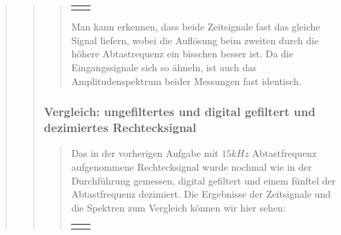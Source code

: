\begin{quote}
\begin{quote}
\begin{quote}
\begin{center}
\begin{tabular}{ll}
\begin{minipage}{0.6\textwidth}
                    \end{minipage}
    
                \end{tabular}
                \end{center}
    			    	
        	\vspace{1.5em}
    	
    	Man kann erkennen, dass beide Zeitsignale fast das gleiche Signal liefern,
    	wobei die Auflösung beim zweiten durch die höhere Abtastrequenz ein
    	bisschen besser ist. Da die Eingangssignale sich so ähneln, ist auch das
    	Amplitudenspektrum beider Messungen fast identisch.
    			
    	\end{quote}
    
        \subsubsection{Vergleich: ungefiltertes und digital gefiltert und
        dezimiertes Rechtecksignal}
        \begin{quote}
        
        Das in der vorherigen Aufgabe mit $15 kHz$ Abtastfrequenz
        aufgenommene Rechtecksignal wurde nochmal wie in der Durchführung gemessen, digital
        gefiltert und einem fünftel der Abtastfrequenz dezimiert. Die Ergebnisse
        der Zeitsignale und die Spektren zum Vergleich können wir hier sehen:
        
        \begin{center}
                \begin{tabular}{ll}
    
                \hspace{-12em}
                    \begin{minipage}{0.6\textwidth}
    

\end{minipage}
\end{tabular}
\end{center}
\end{quote}
\end{quote}
\end{quote}
